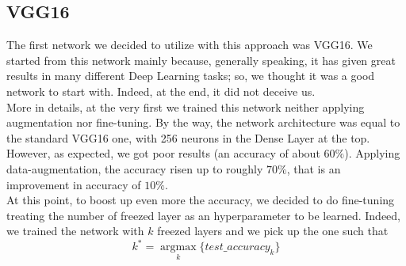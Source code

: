 \documentclass[11pt]{article}
\begin{document}
\subsection{VGG16}
The first network we decided to utilize with this approach was VGG16. We started from this network mainly because, generally speaking, it has given great results in many different Deep Learning tasks; so, we thought it was a good network to start with. Indeed, at the end, it did not deceive us.\\[0.1cm] More in details, at the very first we trained this network neither applying augmentation nor fine-tuning. By the way, the network architecture was equal to the standard VGG16 one, with 256 neurons in the Dense Layer at the top. However, as expected, we got poor results (an accuracy of about $60\%$). Applying data-augmentation, the accuracy risen up to roughly $70\%$, that is an improvement in accuracy of $10\%$.\\[0.1cm]
At this point, to boost up even more the accuracy, we decided to do fine-tuning treating the number of freezed layer as an hyperparameter to be learned. Indeed, we trained the network with $k$ freezed layers and we pick up the one such that
\begin{equation*}
    k^* = \underset{k}{\operatorname{argmax}}\{test\_accuracy_{k}\}
\end{equation*}
\end{document}
